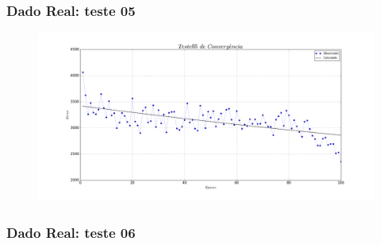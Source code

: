\documentclass[aspectratio=10]{beamer} %
\begin{document}
\begin{frame}
	\frametitle{Dado Real: teste 05}
	\begin{figure}[H]
		\centering
		\includegraphics[scale=0.2]{Imagens/conv05.png}
		\label{Conv05}
	\end{figure} 
\end{frame}

\begin{frame}
	\frametitle{Dado Real: teste 06}
	\begin{figure}[H]
		\centering
		\qquad
		\qquad
		\qquad
		\label{SOMt06}
	\end{figure}
\end{frame}
\end{document}
